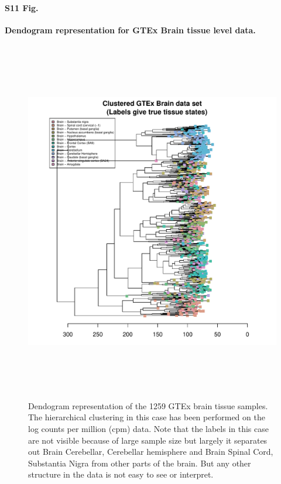\documentclass[10pt,letterpaper]{article}
\begin{document}
\paragraph*{S11 Fig.}

\label{figS11}
{\bf Dendogram representation for GTEx Brain tissue level data.}
\begin{figure}[ht]
\centering
\includegraphics[height=6.3in, width=6in]{../../plots/dendextend_gtex_brain.pdf}
\caption{Dendogram representation of the 1259 GTEx brain tissue samples. 
The hierarchical clustering in this case has been performed on the log counts per million (cpm) data. 
Note that the labels in this case are not visible because of large sample size but largely it separates out
Brain Cerebellar, Cerebellar hemisphere  and Brain Spinal Cord, Substantia Nigra from other parts of the brain. But any other structure in the data is not easy to see or interpret.}
\end{figure}
\end{document}
